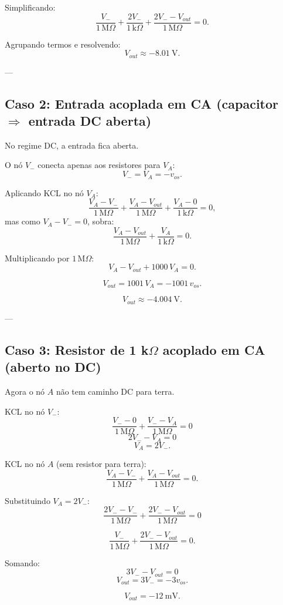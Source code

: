 Simplificando:
\[
\frac{V_-}{1\,\text{M}\Omega}+\frac{2V_-}{1\,\text{k}\Omega}
+ \frac{2V_- - V_{out}}{1\,\text{M}\Omega}=0.
\]

Agrupando termos e resolvendo:
\[
V_{out}\approx -8.01\ \text{V}.
\]

---

\subsection*{Caso 2: Entrada acoplada em CA (capacitor $\Rightarrow$ entrada DC aberta)}

No regime DC, a entrada fica aberta.

O nó $V_-$ conecta apenas aos resistores para $V_A$:
\[
V_- = V_A = -v_{os}.
\]

Aplicando KCL no nó $V_A$:
\[
\frac{V_A - V_-}{1\,\text{M}\Omega}
+\frac{V_A - V_{out}}{1\,\text{M}\Omega}
+\frac{V_A - 0}{1\,\text{k}\Omega}=0,
\]
mas como $V_A - V_- = 0$, sobra:
\[
\frac{V_A - V_{out}}{1\,\text{M}\Omega}
+\frac{V_A}{1\,\text{k}\Omega}=0.
\]

Multiplicando por $1\,\text{M}\Omega$:
\[
V_A - V_{out} + 1000\,V_A = 0.
\]

\[
V_{out} = 1001\,V_A = -1001\,v_{os}.
\]

\[
V_{out}\approx -4.004\ \text{V}.
\]

---

\subsection*{Caso 3: Resistor de 1 k$\Omega$ acoplado em CA (aberto no DC)}

Agora o nó $A$ não tem caminho DC para terra.

KCL no nó $V_-$:
\[
\frac{V_- - 0}{1\,\text{M}\Omega}
+ \frac{V_- - V_A}{1\,\text{M}\Omega}=0
\]
\[
2V_- - V_A = 0
\]
\[
V_A = 2V_-.
\]

KCL no nó $A$ (sem resistor para terra):
\[
\frac{V_A - V_-}{1\,\text{M}\Omega}
+ \frac{V_A - V_{out}}{1\,\text{M}\Omega}=0.
\]

Substituindo $V_A = 2V_-$:
\[
\frac{2V_- - V_-}{1\,\text{M}\Omega}
+ \frac{2V_- - V_{out}}{1\,\text{M}\Omega}=0
\]

\[
\frac{V_-}{1\,\text{M}\Omega}
+ \frac{2V_- - V_{out}}{1\,\text{M}\Omega}=0.
\]

Somando:
\[
3V_- - V_{out} = 0
\]
\[
V_{out}=3V_- = -3v_{os}.
\]

\[
V_{out}=-12\ \text{mV}.
\]


